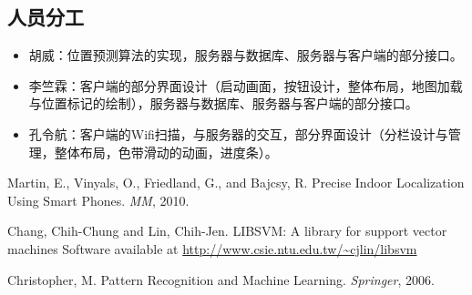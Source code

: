 \documentclass[a4paper,10pt]{article}
\begin{document}
\begin{CJK*}{UTF8}{gbsn}
\section{人员分工}
\begin{itemize}
 \item 胡威：位置预测算法的实现，服务器与数据库、服务器与客户端的部分接口。
 \item 李竺霖：客户端的部分界面设计（启动画面，按钮设计，整体布局，地图加载与位置标记的绘制），服务器与数据库、服务器与客户端的部分接口。
 \item 孔令航：客户端的Wifi扫描，与服务器的交互，部分界面设计（分栏设计与管理，整体布局，色带滑动的动画，进度条）。
\end{itemize}


\begin{thebibliography}{9}

Martin, E., Vinyals, O., Friedland, G., and Bajcsy, R.
Precise Indoor Localization Using Smart Phones.
\emph{MM}, 2010.

Chang, Chih-Chung and Lin, Chih-Jen.
LIBSVM: A library for support vector machines
Software available at \url{http://www.csie.ntu.edu.tw/~cjlin/libsvm}

Christopher, M.
Pattern Recognition and Machine Learning.
\emph{Springer}, 2006.
\end{thebibliography}


\end{CJK*}
\end{document}
